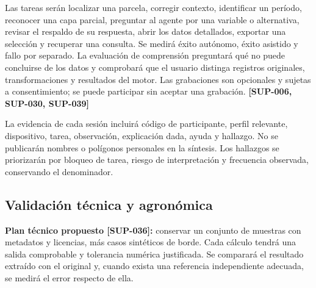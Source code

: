 \documentclass[10pt,a4paper]{article}
\begin{document}
Las tareas serán localizar una parcela, corregir contexto, identificar un período, reconocer una capa parcial, preguntar al agente por una variable o alternativa, revisar el respaldo de su respuesta, abrir los datos detallados, exportar una selección y recuperar una consulta. Se medirá éxito autónomo, éxito asistido y fallo por separado. La evaluación de comprensión preguntará qué no puede concluirse de los datos y comprobará que el usuario distinga registros originales, transformaciones y resultados del motor. Las grabaciones son opcionales y sujetas a consentimiento; se puede participar sin aceptar una grabación. \textbf{[SUP-006, SUP-030, SUP-039]}


La evidencia de cada sesión incluirá código de participante, perfil relevante, dispositivo, tarea, observación, explicación dada, ayuda y hallazgo. No se publicarán nombres o polígonos personales en la síntesis. Los hallazgos se priorizarán por bloqueo de tarea, riesgo de interpretación y frecuencia observada, conservando el denominador.


\subsection{Validación técnica y agronómica}

\textbf{Plan técnico propuesto [SUP-036]:} conservar un conjunto de muestras con metadatos y licencias, más casos sintéticos de borde. Cada cálculo tendrá una salida comprobable y tolerancia numérica justificada. Se comparará el resultado extraído con el original y, cuando exista una referencia independiente adecuada, se medirá el error respecto de ella.
\end{document}
